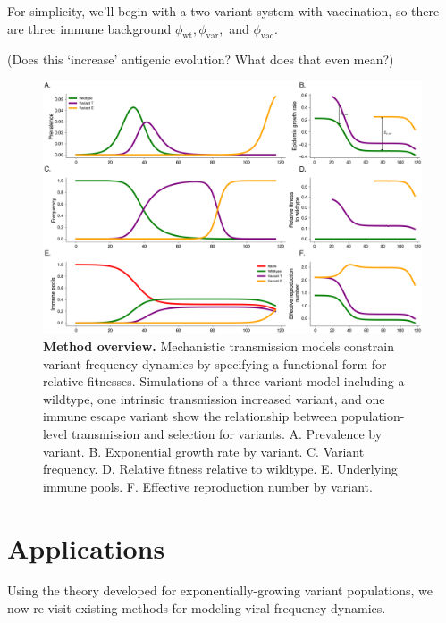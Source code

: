 \documentclass[12pt,oneside,letterpaper]{article}
\newcommand{\wt}{\text{wt}}
\newcommand{\var}{\text{var}}
\newcommand{\vac}{\text{vac}}
\begin{document}


For simplicity, we'll begin with a two variant system with vaccination, so there are three immune background $\phi_{\wt}, \phi_{\var},$ and $\phi_{\vac}$.

(Does this `increase' antigenic evolution? What does that even mean?)

\begin{figure}[h]
    \centering
    \includegraphics[width=0.8\linewidth]{./figures/vis_mechanisms.png}
    \caption{\textbf{Method overview.} 
    Mechanistic transmission models constrain variant frequency dynamics by specifying a functional form for relative fitnesses.
    Simulations of a three-variant model including a wildtype, one intrinsic transmission increased variant, and one immune escape variant show the relationship between population-level transmission and selection for variants.
    A. Prevalence by variant.
    B. Exponential growth rate by variant.
    C. Variant frequency.
    D. Relative fitness relative to wildtype.
    E. Underlying immune pools.
    F. Effective reproduction number by variant.
}%
    \label{fig:vis_mechanisms}
\end{figure}

\section*{Applications}

Using the theory developed for exponentially-growing variant populations, we now re-visit existing methods for modeling viral frequency dynamics.
\end{document}
